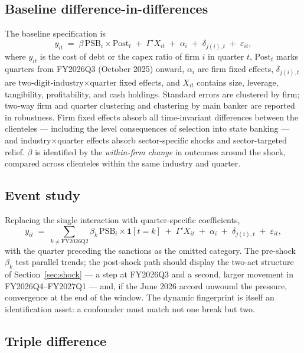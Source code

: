 \documentclass[12pt]{article}
\begin{document}
\subsection{Baseline difference-in-differences}

The baseline specification is
\begin{equation}
y_{it} \;=\; \beta\,\text{PSB}_i \times \text{Post}_t
\;+\; \Gamma' X_{it} \;+\; \alpha_i \;+\; \delta_{j(i),t} \;+\; \varepsilon_{it},
\label{eq:did}
\end{equation}
where $y_{it}$ is the cost of debt or the capex ratio of firm $i$ in quarter $t$,
$\text{Post}_t$ marks quarters from FY2026Q3 (October 2025) onward, $\alpha_i$ are firm
fixed effects, $\delta_{j(i),t}$ are two-digit-industry$\times$quarter fixed effects, and
$X_{it}$ contains size, leverage, tangibility, profitability, and cash holdings. Standard
errors are clustered by firm; two-way firm and quarter clustering and clustering by main
banker are reported in robustness. Firm fixed effects absorb all time-invariant differences
between the clienteles --- including the level consequences of selection into state banking
--- and industry$\times$quarter effects absorb sector-specific shocks and sector-targeted
relief. $\beta$ is identified by the \emph{within-firm change} in outcomes around the shock,
compared across clienteles within the same industry and quarter.

\subsection{Event study}

Replacing the single interaction with quarter-specific coefficients,
\begin{equation}
y_{it} \;=\; \sum_{k \neq \text{FY2026Q2}} \beta_k\,\text{PSB}_i \times
\mathbf{1}[t = k] \;+\; \Gamma' X_{it} \;+\; \alpha_i \;+\; \delta_{j(i),t}
\;+\; \varepsilon_{it},
\label{eq:es}
\end{equation}
with the quarter preceding the sanctions as the omitted category. The pre-shock
$\beta_k$ test parallel trends; the post-shock path should display the two-act structure of
Section~\ref{sec:shock} --- a step at FY2026Q3 and a second, larger movement in
FY2026Q4--FY2027Q1 --- and, if the June 2026 accord unwound the pressure, convergence at
the end of the window. The dynamic fingerprint is itself an identification asset: a
confounder must match not one break but two.

\subsection{Triple difference}
\end{document}
